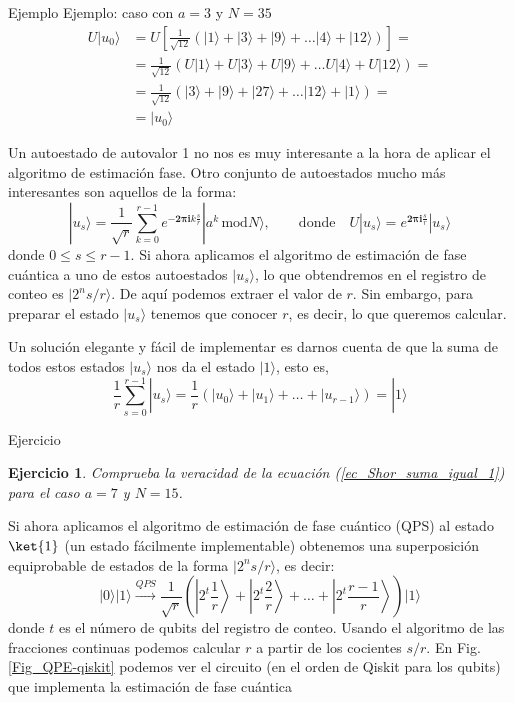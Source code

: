 \documentclass[a4paper,11pt]{book} %
\newtheorem{ejercicio_contador}{Ejercicio}
\newcommand{\Ejercicio}[1]{
		\begin{mybox_gray}{Ejercicio} 
			\begin{ejercicio_contador}
				 #1 
			\end{ejercicio_contador} 
		\end{mybox_gray}
	}
\numberwithin{equation}{chapter}
\begin{document}
\begin{mybox_green}{Ejemplo}
Ejemplo: caso con $a=3$ y $N=35$
\begin{align*}
U |u_0 \rangle & = U \left[ \frac{1}{\sqrt{12}} \left( |1 \rangle + |3\rangle + |9 \rangle + \dots |4 \rangle + |12 \rangle \right) \right] = \\
& = \frac{1}{\sqrt{12}} \left( U|1 \rangle + U|3\rangle + U|9 \rangle + \dots U|4 \rangle + U|12 \rangle \right) = \\
& =\frac{1}{\sqrt{12}} \left( |3 \rangle + |9\rangle + |27 \rangle + \dots |12 \rangle + |1 \rangle \right) = \\
& =  |u_0 \rangle
\end{align*}

\end{mybox_green}

Un autoestado de autovalor 1 no nos es muy interesante a la hora de aplicar el algoritmo de estimación fase. Otro conjunto de autoestados mucho más interesantes son aquellos de la forma:
	\begin{equation}
	| u_s \rangle = \frac{1}{\sqrt{r}} \sum^{r-1}_{k=0} e^{- \boldsymbol{2 \pi i}k \frac{s}{r}} |a^k \, \text{mod} N \rangle, \qquad \text{donde} \quad U|u_s \rangle = e^{\boldsymbol{2 \pi i} \frac{s}{r}}|u_s\rangle
	\end{equation}
donde $0 \leq s \leq r-1$. Si ahora aplicamos el algoritmo de estimación de fase cuántica a uno de estos autoestados $|u_s \rangle$, lo que obtendremos en el registro de conteo es $|2^n s/r \rangle$. De aquí podemos extraer el valor de $r$. Sin embargo, para preparar el estado $|u_s \rangle$ tenemos que conocer $r$, es decir, lo que queremos calcular. 

Un solución elegante y fácil de implementar es darnos cuenta de que la suma de todos estos estados $|u_s \rangle$ nos da el estado $|1\rangle$, esto es,
	\begin{equation} \label{ec_Shor_suma_igual_1}
	\frac{1}{r} \sum_{s=0}^{r-1} |u_s \rangle = \frac{1}{r} \left(|u_0 \rangle + |u_1 \rangle + \dots +|u_{r-1} \rangle \right)  = | 1 \rangle
	\end{equation}

	\Ejercicio{
	Comprueba la veracidad de la ecuación (\ref{ec_Shor_suma_igual_1}) para el caso $a=7$ y $N=15$.
	}

Si ahora aplicamos el algoritmo de estimación de fase cuántico (QPS) al estado $\ket{1}$ (un estado fácilmente implementable) obtenemos una superposición equiprobable de estados de la forma $|2^n s/r \rangle$, es decir:
	\begin{equation}
	|0 \rangle|1 \rangle \xrightarrow{QPS} \frac{1}{\sqrt{r}} \left( \left|2^t \frac{1}{r} \right\rangle + \left|2^t \frac{2}{r} \right\rangle + \dots + \left|2^t \frac{r-1}{r} \right\rangle \right) |1 \rangle
	\end{equation}
donde $t$ es el número de qubits del registro de conteo.
Usando el algoritmo de las fracciones continuas \cite{bib_Continued_fraction} podemos calcular $r$ a partir de los cocientes $s/r$. En Fig. \ref{Fig_QPE-qiskit} podemos ver el circuito (en el orden de Qiskit para los qubits) que implementa la estimación de fase cuántica
\end{document}
